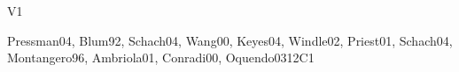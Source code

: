 \begin{syllabus}
\begin{competences}{V1}
    \item {} 
    \item {}
    \item {}
    \item {}
    \item {}
    \item {}
    \item {}
    \item {}
    \item {}
    \item {}
\end{competences}

\begin{unit}{\SEToolsandEnvironments}{}{Pressman04, Blum92, Schach04, Wang00, Keyes04, Windle02, Priest01, Schach04, Montangero96, Ambriola01, Conradi00, Oquendo03}{12}{C1}
\begin{topics}%
    \item \SEToolsandEnvironmentsTopicSoftware
    \item \SEToolsandEnvironmentsTopicRelease
    \item \SEToolsandEnvironmentsTopicRequierements
    \item \SEToolsandEnvironmentsTopicTesting
    \item \SEToolsandEnvironmentsTopicProgramming
    \item \SEToolsandEnvironmentsTopicTool
\end{topics}
\begin{learningoutcomes}
    \item \SEToolsandEnvironmentsTopicSoftware[\Usage]
    \item \SEToolsandEnvironmentsTopicRelease[\Usage]
    \item \SEToolsandEnvironmentsTopicRequierements[\Usage]
    \item \SEToolsandEnvironmentsTopicTesting[\Usage]
    \item \SEToolsandEnvironmentsTopicProgramming[\Usage]
    \item \SEToolsandEnvironmentsTopicTool[\Usage]
\end{learningoutcomes}
\end{unit}


\end{syllabus}
